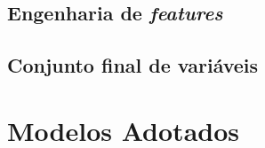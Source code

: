 \subsection{Engenharia de \textit{features}}
\label{subsec:feature_engineering}


\subsection{Conjunto final de variáveis}
\label{subsec:conjunto_variaveis}



\section{Modelos Adotados}
\label{sec:modelos_adotados}


